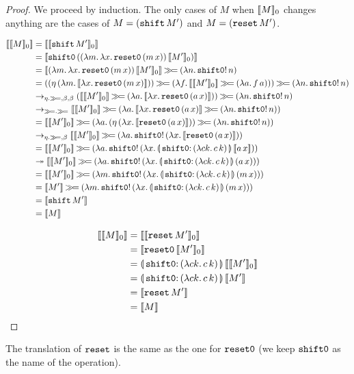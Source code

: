 \begin{proof}
  We proceed by induction. The only cases of $M$ when $\llbracket M \rrbracket_0$ changes
  anything are the cases of $M = (\mathtt{shift}\,M')$ and $M =
  (\mathtt{reset}\,M')$.

\begin{align}
\sem{\semo{M}}
&= \sem{\semo{\ap{\shift}{M'}}} \\
&= \sem{\ap{\shifto}{(\ap{(\lam{m}{\lam{x}{\ap{\reseto}{(\ap{m}{x})}}})}{\semo{M'}})}} \\
&= \sem{\ap{(\lam{m}{\lam{x}{\ap{\reseto}{(\ap{m}{x})}}})}{\semo{M'}}} \hsbind (\lam{n}{\ap{\op{shift0}!}{n}}) \\
&= ((\ap{\eta}{(\lam{m}{\sem{\lam{x}{\ap{\reseto}{(\ap{m}{x})}}}})}) \hsbind (\lam{f}{\sem{\semo{M'}} \hsbind (\lam{a}{\ap{f}{a}})})) \hsbind (\lam{n}{\ap{\op{shift0}!}{n}}) \\
&\to_{\eta.\hsbind,\beta,\beta} (\sem{\semo{M'}} \hsbind (\lam{a}{\sem{\lam{x}{\ap{\reseto}{(\ap{a}{x})}}}})) \hsbind (\lam{n}{\ap{\op{shift0}!}{n}}) \\
&\to_{\hsbind.\hsbind} \sem{\semo{M'}} \hsbind (\lam{a}{\sem{\lam{x}{\ap{\reseto}{(\ap{a}{x})}}} \hsbind (\lam{n}{\ap{\op{shift0}!}{n}})}) \\
&= \sem{\semo{M'}} \hsbind (\lam{a}{(\ap{\eta}{(\lam{x}{\sem{\ap{\reseto}{(\ap{a}{x})}}})}) \hsbind (\lam{n}{\ap{\op{shift0}!}{n}})}) \\
&\to_{\eta.\hsbind,\beta} \sem{\semo{M'}} \hsbind (\lam{a}{\ap{\op{shift0}!}{(\lam{x}{\sem{\ap{\reseto}{(\ap{a}{x})}}})}}) \\
&= \sem{\semo{M'}} \hsbind (\lam{a}{\ap{\op{shift0}!}{(\lam{x}{\ap{\resetobanana}{\sem{\ap{a}{x}}}})}}) \\
&\tto \sem{\semo{M'}} \hsbind (\lam{a}{\ap{\op{shift0}!}{(\lam{x}{\ap{\resetobanana}{(\ap{a}{x})}})}}) \\
&= \sem{\semo{M'}} \hsbind (\lam{m}{\ap{\op{shift0}!}{(\lam{x}{\ap{\resetobanana}{(\ap{m}{x})}})}}) \\
&= \sem{M'} \hsbind (\lam{m}{\ap{\op{shift0}!}{(\lam{x}{\ap{\resetobanana}{(\ap{m}{x})}})}}) \\
&= \sem{\ap{\shift}{M'}} \\
&= \sem{M}
\end{align}
\setcounter{equation}{0}

\begin{align}
\sem{\semo{M}}
&= \sem{\semo{\ap{\reset}{M'}}} \\
&= \sem{\ap{\reseto}{\semo{M'}}} \\
&= \ap{\resetobanana}{\sem{\semo{M'}}} \\
&= \ap{\resetobanana}{\sem{M'}} \\
&= \sem{\ap{\reset}{M'}} \\
&= \sem{M}
\end{align}
\setcounter{equation}{0}
\end{proof}
The translation of $\mathtt{reset}$ is the same as the one for $\mathtt{reset0}$ (we keep
$\mathtt{shift0}$ as the name of the operation). 


